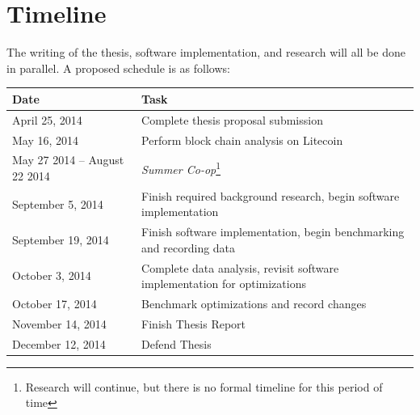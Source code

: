 \documentclass[11pt]{article}
\begin{document}
\section{Timeline}
The writing of the thesis, software implementation, and research will all be
done in parallel. A proposed schedule is as follows:
\begin{center}
\begin{tabularx}{\textwidth}{l|l}
    Date & Task\\
    \hline
    April 25, 2014 & Complete thesis proposal submission\\
    May 16, 2014 & Perform block chain analysis on Litecoin\\
    May 27 2014 -- August 22 2014 & \emph{Summer Co-op}\footnote{Research will
                                    continue, but there is no formal timeline for
                                    this period of time}\\
    September 5, 2014 & Finish required background research, begin software
                        implementation\\
    September 19, 2014 & Finish software implementation, begin benchmarking and
                         recording data\\
    October 3, 2014 & Complete data analysis, revisit software implementation
                      for optimizations\\
    October 17, 2014 & Benchmark optimizations and record changes\\
    November 14, 2014 & Finish Thesis Report\\
    December 12, 2014 & Defend Thesis\\
\end{tabularx}
\end{center}


\end{document}
